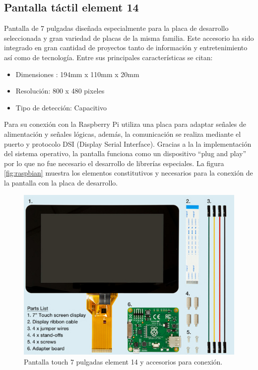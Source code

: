  \subsection{Pantalla táctil element 14}
Pantalla de 7 pulgadas diseñada especialmente para la placa de desarrollo seleccionada y gran variedad de placas de la misma familia. 
Este accesorio ha sido integrado en gran cantidad de proyectos tanto de información y entretenimiento así como de tecnología. 
Entre sus principales características se citan:

\begin{itemize}
\item Dimensiones : 194mm x 110mm x 20mm 
\item Resolución: 800 x 480 pixeles
\item Tipo de detección: Capacitivo
\end{itemize}

Para su conexión con la Raspberry Pi utiliza una placa para adaptar señales de alimentación y señales lógicas, además, la comunicación se realiza mediante el puerto y protocolo  DSI (Display Serial Interface).
Gracias a la la implementación del sistema operativo, la pantalla funciona como un dispositivo “plug and play” por lo que no fue necesario el desarrollo de librerías especiales.
La figura \ref{fig:raspbian} muestra los elementos constitutivos y necesarios para la conexión de la pantalla con la placa de desarrollo.

\begin{figure}[h]
	\centering
	\includegraphics[scale=.5]{./Figures/pantalla.png}
	\caption{Pantalla touch 7 pulgadas element 14 y accesorios para conexión.}
	\label{fig:pantalla}
\end{figure}

